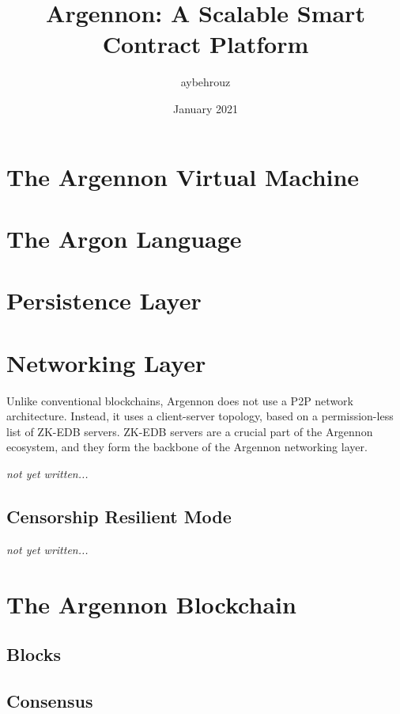 \documentclass[11pt, a4paper]{report}
\title{Argennon: A Scalable Smart Contract Platform}
\author{aybehrouz}
\date{January 2021}
\newcommand{\note}[1] {
    \begin{tcolorbox}[colframe=white,colback=white]
        \emph{#1}
    \end{tcolorbox}
}
\begin{document}
    \tableofcontents


    \chapter{The Argennon Virtual Machine}\label{ch:AVM}
    


    \chapter{The Argon Language}\label{ch:argon-lang}
    


    \chapter{Persistence Layer}\label{ch:persistance}
    


    \chapter{Networking Layer}\label{ch:networking}
    Unlike conventional blockchains, Argennon does not use a P2P network architecture. Instead, it uses a
    client-server topology, based on a permission-less list of ZK-EDB servers. ZK-EDB servers are a
    crucial part of the Argennon ecosystem, and they form the backbone of the Argennon networking layer.
    \note{not yet written...}


    \section{Censorship Resilient Mode}\label{sec:cens-res-mode}
    \note{not yet written...}


    \chapter{The Argennon Blockchain}\label{ch:argennon-blockchain}
    


    \section{Blocks}\label{sec:blocks}
    


    \section{Consensus}\label{sec:consensus}
    
\end{document}
